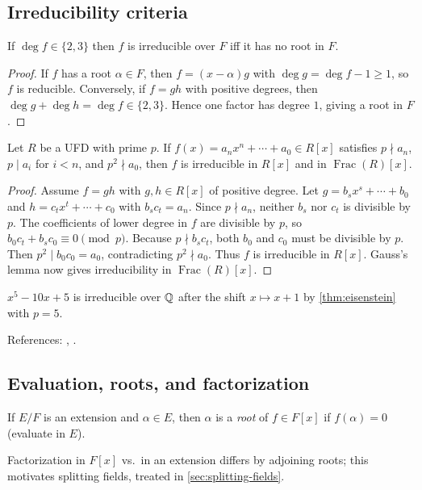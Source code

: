 \subsection{Irreducibility criteria}
\begin{proposition}[Degree $2$ or $3$]
If $\deg f\in\{2,3\}$ then $f$ is irreducible over $F$ iff it has no root in $F$.
\end{proposition}
\begin{proof}
If $f$ has a root $\alpha\in F$, then $f=(x-\alpha)g$ with $\deg g=\deg f-1\ge1$, so $f$ is reducible. Conversely, if $f=gh$ with positive degrees, then $\deg g+\deg h=\deg f\in\{2,3\}$. Hence one factor has degree $1$, giving a root in $F$.
\end{proof}
\begin{theorem}[Eisenstein]\label{thm:eisenstein}
Let $R$ be a UFD with prime $p$. If $f(x)=a_nx^n+\cdots+a_0\in R[x]$ satisfies $p\nmid a_n$, $p\mid a_i$ for $i<n$, and $p^2\nmid a_0$, then $f$ is irreducible in $R[x]$ and in $\operatorname{Frac}(R)[x]$.
\end{theorem}
\begin{proof}
Assume $f=gh$ with $g,h\in R[x]$ of positive degree. Let $g=b_sx^s+\cdots+b_0$ and $h=c_tx^t+\cdots+c_0$ with $b_s c_t=a_n$. Since $p\nmid a_n$, neither $b_s$ nor $c_t$ is divisible by $p$. The coefficients of lower degree in $f$ are divisible by $p$, so $b_0c_t+b_sc_0\equiv0\pmod p$. Because $p\nmid b_s c_t$, both $b_0$ and $c_0$ must be divisible by $p$. Then $p^2\mid b_0c_0=a_0$, contradicting $p^2\nmid a_0$. Thus $f$ is irreducible in $R[x]$. Gauss's lemma now gives irreducibility in $\operatorname{Frac}(R)[x]$.
\end{proof}
\begin{example}
$x^5-10x+5$ is irreducible over $\mathbb{Q}$ after the shift $x\mapsto x+1$ by \cref{thm:eisenstein} with $p=5$.
\end{example}
References: \cite[\S9--11]{DF}, \cite[Ch.~II]{Lang}.

\subsection{Evaluation, roots, and factorization}
\begin{definition}
If $E/F$ is an extension and $\alpha\in E$, then $\alpha$ is a \emph{root} of $f\in F[x]$ if $f(\alpha)=0$ (evaluate in $E$).
\end{definition}
\begin{remark}
Factorization in $F[x]$ vs.\ in an extension differs by adjoining roots; this motivates splitting fields, treated in \cref{sec:splitting-fields}.
\end{remark}
